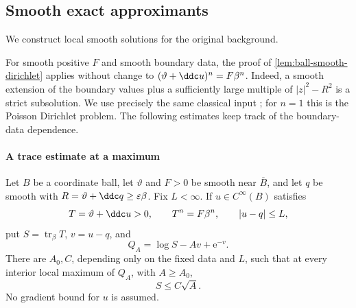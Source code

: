 \subsection{Smooth exact approximants}\label{sec:interior-approximants}

We construct local smooth solutions for the original background.

For smooth positive $F$ and smooth boundary data, the proof of
\cref{lem:ball-smooth-dirichlet} applies without change to
$(\vartheta+\ddc u)^n=F\beta^n$. Indeed, a smooth extension of the boundary
values plus a sufficiently large multiple of $|z|^2-R^2$ is a strict
subsolution. We use precisely the same classical input
\cite[Theorem~1.1]{GL10}; for $n=1$ this is the Poisson Dirichlet problem.
The following estimates keep track of the boundary-data dependence.

\paragraph{A trace estimate at a maximum}

\begin{lemma}\label{lem:interior-trace-peak}
Let $B$ be a coordinate ball, let $\vartheta$ and $F>0$ be smooth near $\overline B$, and let $q$ be smooth with $R=\vartheta+\ddc q\geq\varepsilon\beta$. Fix $L<\infty$. If $u\in C^\infty(B)$ satisfies
\[
  T=\vartheta+\ddc u>0,
  \qquad T^n=F\beta^n,
  \qquad |u-q|\leq L,
\]
put $S=\operatorname{tr}_\beta T$, $v=u-q$, and
\[
  Q_A=\log S-Av+\mathrm{e}^{-v}.
\]
There are $A_0,C$, depending only on the fixed data and $L$, such that at every interior local maximum of $Q_A$, with $A\geq A_0$,
\begin{equation}\label{eq:interior-trace-peak}
  S\leq C\sqrt A.
\end{equation}
No gradient bound for $u$ is assumed.
\end{lemma}

